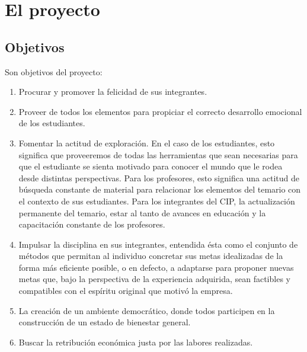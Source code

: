 \documentclass[10pt,letterpaper]{book}
\begin{document}
\section{El proyecto}

\subsection{Objetivos}
Son objetivos del proyecto:
\begin{enumerate}
\item Procurar y promover la felicidad de sus integrantes.
\item Proveer de todos los elementos para propiciar el correcto desarrollo emocional de los estudiantes.
\item Fomentar la actitud de exploración. En el caso de los estudiantes, esto significa que proveeremos de todas las herramientas que sean necesarias para que el estudiante se sienta motivado para conocer el mundo que le rodea desde distintas perspectivas. Para los profesores, esto significa una actitud de búsqueda constante de material para relacionar los elementos del temario con el contexto de sus estudiantes. Para los integrantes del CIP, la actualización permanente del temario, estar al tanto de avances en educación y la capacitación constante de los profesores.
\item Impulsar la disciplina en sus integrantes, entendida ésta como el conjunto de métodos que permitan al individuo concretar sus metas idealizadas de la forma más eficiente posible, o en defecto, a adaptarse para proponer nuevas metas que, bajo la perspectiva de la experiencia adquirida, sean factibles y compatibles con el espíritu original que motivó la empresa.
\item La creación de un ambiente democrático, donde todos participen en la construcción de un estado de bienestar general.
\item Buscar la retribución económica justa por las labores realizadas.
\end{enumerate}
\end{document}
